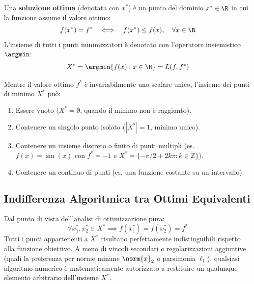 \begin{definition}
Una \textbf{soluzione ottima} (denotata con $x^*$) \`e un punto del dominio $x^* \in \R$ in cui la funzione assume il valore ottimo:
\begin{equation}
f(x^*) = f^* \quad \Longleftrightarrow \quad f(x^*) \le f(x), \quad \forall x \in \R
\end{equation}
L'insieme di tutti i punti minimizzatori \`e denotato con l'operatore insiemistico $\argmin$:
\begin{equation}
X^* = \argmin \{ f(x) : x \in \R \} = L(f, f^*)
\end{equation}
\end{definition}

\begin{property}
Mentre il valore ottimo $f^*$ \`e invariabilmente uno scalare unico, l'insieme dei punti di minimo $X^*$ pu\`o:
\begin{enumerate}
    \item Essere vuoto ($X^* = \emptyset$, quando il minimo non \`e raggiunto).
    \item Contenere un singolo punto isolato ($|X^*| = 1$, minimo unico).
    \item Contenere un insieme discreto o finito di punti multipli (es. $f(x) = \sin(x)$ con $f^* = -1$ e $X^* = \{ -\pi/2 + 2k\pi : k \in \mathbb{Z} \}$).
    \item Contenere un continuo di punti (es. una funzione costante su un intervallo).
\end{enumerate}
\end{property}

\subsection{Indifferenza Algoritmica tra Ottimi Equivalenti}
Dal punto di vista dell'analisi di ottimizzazione pura:
\begin{equation}
\forall x_1^*, x_2^* \in X^* \implies f(x_1^*) = f(x_2^*) = f^*
\end{equation}
Tutti i punti appartenenti a $X^*$ risultano perfettamente indistinguibili rispetto alla funzione obiettivo. A meno di vincoli secondari o regolarizzazioni aggiuntive (quali la preferenza per norme minime $\norm{x}_2$ o parsimonia $\ell_1$), qualsiasi algoritmo numerico \`e matematicamente autorizzato a restituire un qualunque elemento arbitrario dell'insieme $X^*$.


